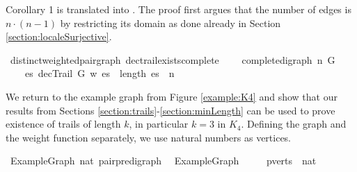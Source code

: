 \begin{isabellebody}
\isadelimproof
%
\endisadelimproof
%
\isatagproof
%
\endisatagproof
{\isafoldproof}%
%
\isadelimproof
%
\endisadelimproof
%
\begin{isamarkuptext}%
Corollary 1 is translated into . The proof first argues
that the number of edges is $n\cdot(n-1)$ by restricting its domain as done already in Section \ref{section:localeSurjective}.%
\end{isamarkuptext}\isamarkuptrue%
%
\isadelimproof
%
\endisadelimproof
%
\isatagproof
%
\endisatagproof
{\isafoldproof}%
%
\isadelimproof
%
\endisadelimproof
{}\isamarkupfalse%
{\isacharparenleft}\ distinct{\isacharunderscore}weighted{\isacharunderscore}pair{\isacharunderscore}graph{\isacharparenright}\ dec{\isacharunderscore}trail{\isacharunderscore}exists{\isacharunderscore}complete{\isacharcolon}\ \isanewline
\ \ \ {\isachardoublequoteopen}complete{\isacharunderscore}digraph\ n\ G{\isachardoublequoteclose}\ \isanewline
\ \ \ {\isachardoublequoteopen}{\isasymexists}\ es{\isachardot}\ decTrail\ G\ w\ es\ {\isasymand}\ length\ es\ {\isacharequal}\ n{\isacharminus}{}{\isachardoublequoteclose}%
\isadelimproof
%
\endisadelimproof
%
\isatagproof
%
\endisatagproof
{\isafoldproof}%
%
\isadelimproof
%
\endisadelimproof
%
\isadelimdocument
%
\endisadelimdocument
%
\isatagdocument
%
\isamarkuptrue%
%
\endisatagdocument
{\isafolddocument}%
%
\isadelimdocument
%
\endisadelimdocument
%
\begin{isamarkuptext}%
We return to the example graph from Figure \ref{example:K4} and show that our results from 
Sections \ref{section:trails}-\ref{section:minLength} can be used to prove existence of trails of length $k$, in particular
$k = 3$ in $K_4$. Defining the graph and the 
weight function separately, we use natural numbers as vertices.%
\end{isamarkuptext}\isamarkuptrue%
\isamarkupfalse%
\ ExampleGraph{\isacharcolon}{\isacharcolon}\ {\isachardoublequoteopen}nat\ pair{\isacharunderscore}pre{\isacharunderscore}digraph{\isachardoublequoteclose}\ \ \isanewline
{\isachardoublequoteopen}ExampleGraph\ {\isasymequiv}\ {\isacharparenleft}{\isacharbar}\ \isanewline
\ \ pverts\ {\isacharequal}\ {\isacharbraceleft}{}{\isacharcomma}{}{\isacharcomma}{}{\isacharcomma}{\isacharparenleft}{}{\isacharcolon}{\isacharcolon}nat{\isacharparenright}{\isacharbraceright}{\isacharcomma}\ \isanewline

\end{isabellebody}
